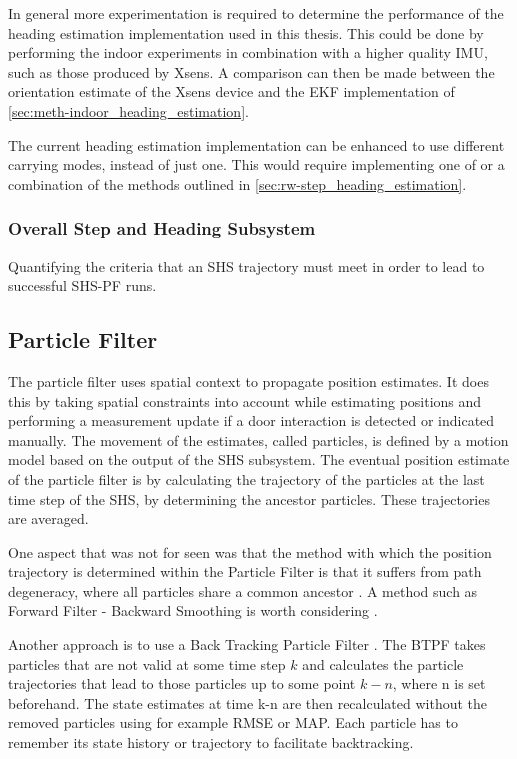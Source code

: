 In general more experimentation is required to determine the performance of the heading estimation implementation used in this thesis. This could be done by performing the indoor experiments in combination with a higher quality \ac{IMU}, such as those produced by Xsens. A comparison can then be made between the orientation estimate of the Xsens device and the EKF implementation of \cref{sec:meth-indoor_heading_estimation}.\par 

The current heading estimation implementation can be enhanced to use different carrying modes, instead of just one. This would require implementing one of or a combination of the methods outlined in \cref{sec:rw-step_heading_estimation}.


\subsubsection{Overall Step and Heading Subsystem }

Quantifying the criteria that an SHS trajectory must meet in order to lead to successful SHS-PF runs.

\subsection{Particle Filter}
The particle filter uses spatial context to propagate position estimates. It does this by taking spatial constraints into account while estimating positions and performing a measurement update if a door interaction is detected or indicated manually. The movement of the estimates, called particles, is defined by a motion model based on the output of the SHS subsystem. The eventual position estimate of the particle filter is by calculating the trajectory of the particles at the last time step of the SHS, by determining the ancestor particles. These trajectories are averaged.

One aspect that was not for seen was that the method with which the position trajectory is determined within the Particle Filter is that it suffers from path degeneracy, where all particles share a common ancestor \cite{Lindsten2013}. A method such as Forward Filter - Backward Smoothing is worth considering \cite{Lindsten2013}.

Another approach is to use a Back Tracking Particle Filter . The BTPF takes particles that are not valid at some time step $ k $ and calculates the particle trajectories that lead to those particles up to some point $ k - n $, where n is set beforehand. The state estimates at time k-n are then recalculated without the removed particles using for example RMSE or MAP. Each particle has to remember its state history or trajectory to facilitate backtracking. 

